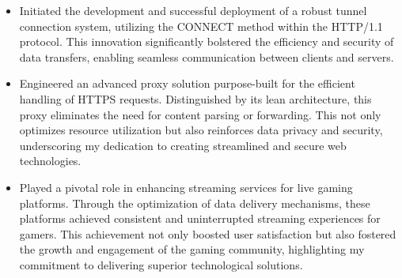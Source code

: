 \documentclass{resume}
\begin{document}
\begin{itemize}
  \item Initiated the development and successful deployment of a robust tunnel connection system, utilizing the CONNECT method within the HTTP/1.1 protocol. This innovation significantly bolstered the efficiency and security of data transfers, enabling seamless communication between clients and servers.
  \item Engineered an advanced proxy solution purpose-built for the efficient handling of HTTPS requests. Distinguished by its lean architecture, this proxy eliminates the need for content parsing or forwarding. This not only optimizes resource utilization but also reinforces data privacy and security, underscoring my dedication to creating streamlined and secure web technologies.
  \item Played a pivotal role in enhancing streaming services for live gaming platforms. Through the optimization of data delivery mechanisms, these platforms achieved consistent and uninterrupted streaming experiences for gamers. This achievement not only boosted user satisfaction but also fostered the growth and engagement of the gaming community, highlighting my commitment to delivering superior technological solutions.
\end{itemize}


\end{document}
